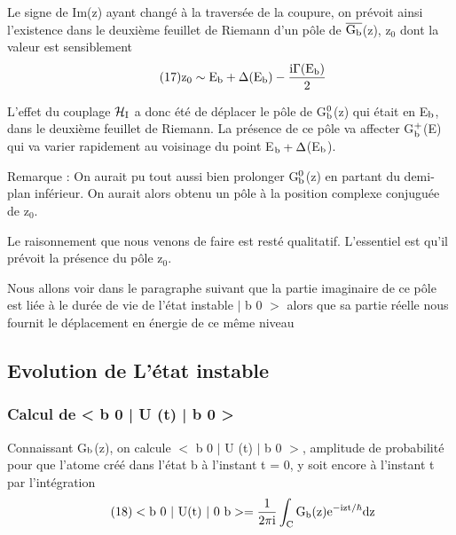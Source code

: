 Le signe de Im(z) ayant changé à la traversée de la coupure, on
prévoit ainsi l'existence dans le deuxième feuillet de Riemann d'un pôle de
$\overline{\text{G}_{\text{b}}}$(z), z$_0$ dont la valeur est sensiblement
\[
\tag{17}\text{z}_{\text{0}}\sim\text{E}_{\text{b}}+\Delta(\text{E}_{\text{b}})-\frac{\text{i}\Gamma(\text{E}_{\text{b}})}{2}
\]

\begin{center}  \end{center}

L'effet du couplage $\mathcal{H}_{\text{I}}$ a donc été de déplacer le pôle de G$^0_{\text{b}}$(z)
qui était en E$_{\text{b}}$, dans le deuxième feuillet de Riemann. La présence de ce pôle
va affecter G$^+_{\text{b}}$(E) qui va varier rapidement au voisinage du point E$_{\text{b}}+\Delta$(E$_{\text{b}}$).

Remarque : On aurait pu tout aussi bien prolonger G$^0_{\text{b}}$(z) en partant du demi-plan
inférieur. On aurait alors obtenu un pôle à la position complexe conjuguée
de z$_0$.
 
Le raisonnement que nous venons de faire est resté qualitatif.
L'essentiel est qu'il prévoit la présence du pôle z$_0$.

Nous allons voir dans le paragraphe suivant que la partie imaginaire de ce pôle est liée à le durée de vie de l'état instable $|$ b 0 $>$ alors que
sa partie réelle nous fournit le déplacement en énergie de ce même niveau

\subsection{Evolution de L'état instable}%
\subsubsection{Calcul de < b 0 | U (t) | b 0 >} %
Connaissant G$_{\text{b}}$(z), on calcule $<$ b 0 $|$ U (t) $|$ b 0 $>$, amplitude de probabilité pour que l'atome créé dans l'état b à l'instant t = 0, y
soit encore à l'instant t par l'intégration
\[
\tag{18}<\text{b }0\ |\ \text{U(t)}\ |\ 0\text{ b}> = \frac{1}{2\pi\text{i}}
\int_{\text{C}} \text{G}_{\text{b}}(\text{z})\text{e}^{-\text{izt}/\hbar}\text{dz}
\]

